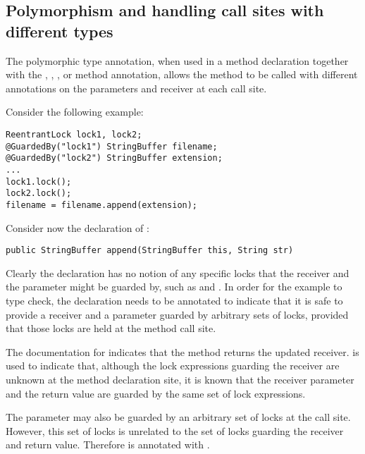\subsection{Polymorphism and handling call sites with different types\label{lock-checker-polymorphism}}

The polymorphic  type annotation, when used in a method
declaration together with the , ,
, or  method annotation, allows the method
to be called with different  annotations on the parameters
and receiver at each call site.

Consider the following example:

\begin{verbatim}
ReentrantLock lock1, lock2;
@GuardedBy("lock1") StringBuffer filename;
@GuardedBy("lock2") StringBuffer extension;
...
lock1.lock();
lock2.lock();
filename = filename.append(extension);
\end{verbatim}

Consider now the declaration of :

\begin{verbatim}
public StringBuffer append(StringBuffer this, String str)
\end{verbatim}

Clearly the declaration has no notion of any specific locks that the receiver
and the  parameter might be guarded by, such as  and .
In order for the example to type check, the declaration needs to be annotated
to indicate that it is safe to provide a receiver and a parameter guarded by
arbitrary sets of locks, provided that those locks are held at the method
call site.

The documentation for 
indicates that the method returns the updated receiver.
 is used
to indicate that, although the lock expressions guarding the receiver
are unknown at the method declaration site, it is known that the receiver
parameter and the return value are guarded by the same set of lock expressions.

The parameter  may also be guarded by an arbitrary set of locks at the call
site.  However, this set of locks is unrelated to the set of locks guarding
the receiver and return value.  Therefore  is annotated with
.

